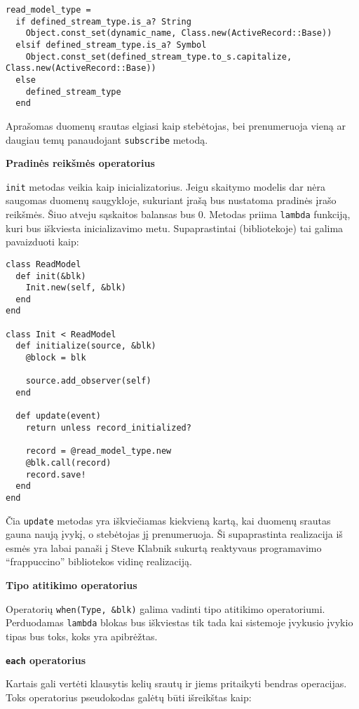 \begin{lstlisting}
read_model_type =
  if defined_stream_type.is_a? String
    Object.const_set(dynamic_name, Class.new(ActiveRecord::Base))
  elsif defined_stream_type.is_a? Symbol
    Object.const_set(defined_stream_type.to_s.capitalize, Class.new(ActiveRecord::Base))
  else
    defined_stream_type
  end
\end{lstlisting}

Aprašomas duomenų srautas elgiasi kaip stebėtojas, bei prenumeruoja vieną ar daugiau temų panaudojant \lstinline|subscribe| metodą.

\textbf{Pradinės reikšmės operatorius}

\lstinline|init| metodas veikia kaip inicializatorius. Jeigu skaitymo modelis dar nėra saugomas duomenų saugykloje, sukuriant įrašą bus nustatoma pradinės įrašo reikšmės. Šiuo atveju sąskaitos balansas bus 0. Metodas priima \lstinline|lambda| funkciją, kuri bus iškviesta inicializavimo metu. Supaprastintai (bibliotekoje) tai galima pavaizduoti kaip:

\begin{lstlisting}
class ReadModel
  def init(&blk)
    Init.new(self, &blk)
  end
end

class Init < ReadModel
  def initialize(source, &blk)
    @block = blk

    source.add_observer(self)
  end

  def update(event)
    return unless record_initialized?

    record = @read_model_type.new
    @blk.call(record)
    record.save!
  end
end
\end{lstlisting}

Čia \lstinline|update| metodas yra iškviečiamas kiekvieną kartą, kai duomenų srautas gauna naują įvykį, o stebėtojas jį prenumeruoja. Ši supaprastinta realizacija iš esmės yra labai panaši į Steve Klabnik sukurtą reaktyvaus programavimo ``frappuccino'' bibliotekos vidinę realizaciją.

\textbf{Tipo atitikimo operatorius}

Operatorių \lstinline|when(Type, &blk)| galima vadinti tipo atitikimo operatoriumi. Perduodamas \lstinline|lambda| blokas bus iškviestas tik tada kai sistemoje įvykusio įvykio tipas bus toks, koks yra apibrėžtas.

\textbf{\lstinline|each| operatorius}

Kartais gali vertėti klausytis kelių srautų ir jiems pritaikyti bendras operacijas. Toks operatorius pseudokodas galėtų būti išreikštas kaip:

